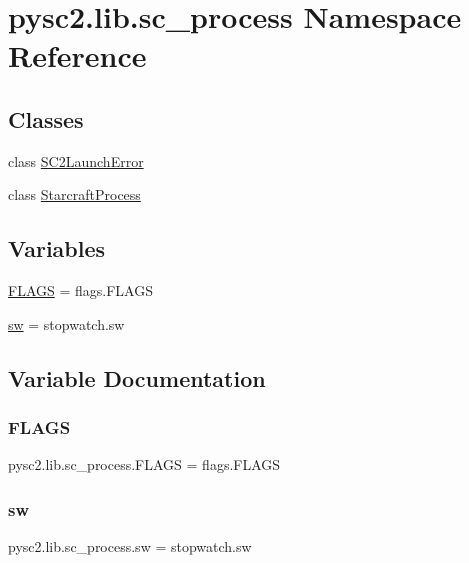 \hypertarget{namespacepysc2_1_1lib_1_1sc__process}{}\section{pysc2.\+lib.\+sc\+\_\+process Namespace Reference}
\label{namespacepysc2_1_1lib_1_1sc__process}
\subsection*{Classes}
\begin{DoxyCompactItemize}
\item 
class \mbox{\hyperlink{classpysc2_1_1lib_1_1sc__process_1_1_s_c2_launch_error}{S\+C2\+Launch\+Error}}
\item 
class \mbox{\hyperlink{classpysc2_1_1lib_1_1sc__process_1_1_starcraft_process}{Starcraft\+Process}}
\end{DoxyCompactItemize}
\subsection*{Variables}
\begin{DoxyCompactItemize}
\item 
\mbox{\hyperlink{namespacepysc2_1_1lib_1_1sc__process_a920e2ee62ebb8cb875809e53ff2bb7c8}{F\+L\+A\+GS}} = flags.\+F\+L\+A\+GS
\item 
\mbox{\hyperlink{namespacepysc2_1_1lib_1_1sc__process_a1c4ebd1d83ad46d099f15a6331d31621}{sw}} = stopwatch.\+sw
\end{DoxyCompactItemize}


\subsection{Variable Documentation}
\mbox{\label{namespacepysc2_1_1lib_1_1sc__process_a920e2ee62ebb8cb875809e53ff2bb7c8}} 
\subsubsection{\texorpdfstring{F\+L\+A\+GS}{FLAGS}}
{\footnotesize\ttfamily pysc2.\+lib.\+sc\+\_\+process.\+F\+L\+A\+GS = flags.\+F\+L\+A\+GS}

\mbox{\label{namespacepysc2_1_1lib_1_1sc__process_a1c4ebd1d83ad46d099f15a6331d31621}} 
\subsubsection{\texorpdfstring{sw}{sw}}
{\footnotesize\ttfamily pysc2.\+lib.\+sc\+\_\+process.\+sw = stopwatch.\+sw}

